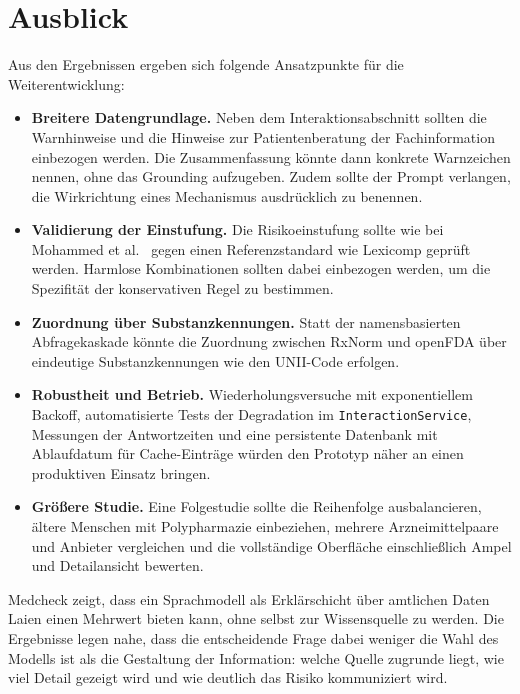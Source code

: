\section{Ausblick}

Aus den Ergebnissen ergeben sich folgende Ansatzpunkte für die Weiterentwicklung:

\begin{itemize}
  \item \textbf{Breitere Datengrundlage.} Neben dem Interaktionsabschnitt sollten die Warnhinweise und die Hinweise zur Patientenberatung der Fachinformation einbezogen werden. Die Zusammenfassung könnte dann konkrete Warnzeichen nennen, ohne das Grounding aufzugeben. Zudem sollte der Prompt verlangen, die Wirkrichtung eines Mechanismus ausdrücklich zu benennen.
  \item \textbf{Validierung der Einstufung.} Die Risikoeinstufung sollte wie bei Mohammed et al.~\cite{MOHAMMED2026100733} gegen einen Referenzstandard wie Lexicomp geprüft werden. Harmlose Kombinationen sollten dabei einbezogen werden, um die Spezifität der konservativen Regel zu bestimmen.
  \item \textbf{Zuordnung über Substanzkennungen.} Statt der namensbasierten Abfragekaskade könnte die Zuordnung zwischen RxNorm und openFDA über eindeutige Substanzkennungen wie den UNII-Code erfolgen.
  \item \textbf{Robustheit und Betrieb.} Wiederholungsversuche mit exponentiellem Backoff, automatisierte Tests der Degradation im \texttt{InteractionService}, Messungen der Antwortzeiten und eine persistente Datenbank mit Ablaufdatum für Cache-Einträge würden den Prototyp näher an einen produktiven Einsatz bringen.
  \item \textbf{Größere Studie.} Eine Folgestudie sollte die Reihenfolge ausbalancieren, ältere Menschen mit Polypharmazie einbeziehen, mehrere Arzneimittelpaare und Anbieter vergleichen und die vollständige Oberfläche einschließlich Ampel und Detailansicht bewerten.
\end{itemize}

Medcheck zeigt, dass ein Sprachmodell als Erklärschicht über amtlichen Daten Laien einen Mehrwert bieten kann, ohne selbst zur Wissensquelle zu werden. Die Ergebnisse legen nahe, dass die entscheidende Frage dabei weniger die Wahl des Modells ist als die Gestaltung der Information: welche Quelle zugrunde liegt, wie viel Detail gezeigt wird und wie deutlich das Risiko kommuniziert wird.

